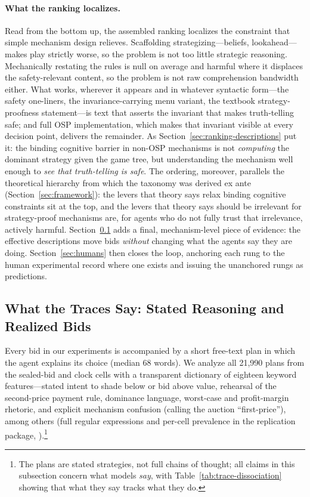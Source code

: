 \paragraph{What the ranking localizes.}
Read from the bottom up, the assembled ranking localizes the constraint that
simple mechanism design relieves. Scaffolding strategizing---beliefs,
lookahead---makes play strictly worse, so the problem is not too little
strategic reasoning. Mechanically restating the rules is null on average and
harmful where it displaces the safety-relevant content, so the problem is not
raw comprehension bandwidth either. What works, wherever it appears and in
whatever syntactic form---the safety one-liners, the invariance-carrying menu
variant, the textbook strategy-proofness statement---is text that asserts the
invariant that makes truth-telling safe; and full OSP implementation, which
makes that invariant visible at every decision point, delivers the remainder.
As Section~\ref{sec:ranking-descriptions} put it: the binding cognitive
barrier in non-OSP mechanisms is not \emph{computing} the dominant strategy
given the game tree, but understanding the mechanism well enough to \emph{see
that truth-telling is safe}. The ordering, moreover, parallels the
theoretical hierarchy from which the taxonomy was derived ex ante
(Section~\ref{sec:framework}): the levers that theory says relax binding
cognitive constraints sit at the top, and the levers that theory says should
be irrelevant for strategy-proof mechanisms are, for agents who do not fully
trust that irrelevance, actively harmful. Section~\ref{sec:ranking-traces}
adds a final, mechanism-level piece of evidence: the effective descriptions
move bids \emph{without} changing what the agents say they are doing.
Section~\ref{sec:humans} then closes the loop, anchoring each rung to the
human experimental record where one exists and issuing the unanchored rungs
as predictions.

\subsection{What the Traces Say: Stated Reasoning and Realized Bids}
\label{sec:ranking-traces}

Every bid in our experiments is accompanied by a short free-text plan in
which the agent explains its choice (median 68 words). We analyze all
21{,}990 plans from the sealed-bid and clock cells with a transparent
dictionary of eighteen keyword features---stated intent to shade below or bid above
value, rehearsal of the second-price payment rule, dominance language,
worst-case and profit-margin rhetoric, and explicit mechanism confusion
(calling the auction ``first-price''), among others (full regular expressions
and per-cell prevalence in the replication package,
).\footnote{The plans are stated
strategies, not full chains of thought; all claims in this subsection concern
what models \emph{say}, with Table~\ref{tab:trace-dissociation} showing that
what they say tracks what they do.}

